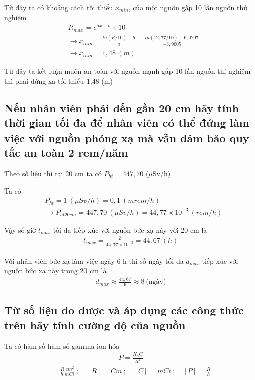 \documentclass{article}
\begin{document}
Từ đây ta có khoảng cách tối thiểu $x_{min}$, của một nguồn gấp 10 lần nguồn thử nghiệm
\begin{align*}
	&R_{max} = e^{ax + b} \times 10 \\
	& \rightarrow x_{min} = \frac{ln(R/10) - b}{a} = \frac{ln(12,77/10) - 6,0207}{-3,9005} \\
	& \rightarrow x_{min} = 1,48 \ (m)
\end{align*}

Từ đây ta kết luận muôn an toàn với nguồn mạnh gấp 10 lần nguồn thí nghiệm thì phải đứng xa tối thiểu 1,48 (m)

\subsection{Nếu nhân viên phải đến gần 20 cm hãy tính thời gian tối đa để nhân viên có thể đứng làm việc với nguồn phóng xạ mà vẫn đảm bảo quy tắc an toàn 2 rem/năm}

Theo số liệu thì tại 20 cm ta có $P_{ht} = 447,70$ ($\mu$Sv/h)

Ta có
\begin{align*}
	& P_{ht} = 1 \ (\mu Sv/h) = 0,1 \ (mrem/h) \\
	& \rightarrow P_{ht 20cm} = 447,70 \ (\mu Sv/h) = 44,77 \times 10^{-3} \ (rem/h)
\end{align*}

Vậy số giờ $t_{max}$ tối đa tiếp xúc với nguồn bức xạ này với 20 cm là
\begin{align*}
	t_{max} = \frac{2}{44,77 \times 10^{-3}} = 44,67 \ (h)
\end{align*}

Với nhân viên bức xạ làm việc ngày 6 h thì số ngày tối đa $d_{max}$ tiếp xúc với nguồn bức xạ này trong 20 cm là
\begin{align*}
	d_{max} \approx \frac{44,67}{6} \approx 8 \ \text{(ngày)}
\end{align*}

\subsection{Từ số liệu đo được và áp dụng các công thức trên hãy tính cường độ của nguồn}

Ta có hàm số hàm số gamma ion hóa
\begin{align}
	P = \frac{K_\gamma C}{R^2}
\end{align}
\begin{align*}
	[K_\gamma] = \frac{R.cm^2}{h.mCi} \ ; \quad [R] = Cm \ ; \quad [C] = mCi \ ; \quad [P] = \frac{R}{h}
\end{align*}
\end{document}
